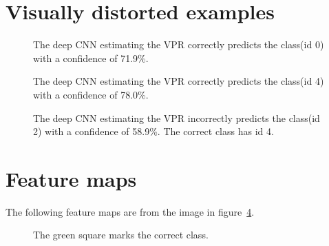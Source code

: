 \section{Visually distorted examples}
\label{sec:vdexamples}
\begin{figure}[H]
	\begin{center}
	\begin{scriptsize}
		\sffamily
		
	\end{scriptsize}
	\end{center}
	\caption[Visually distorted example]{The deep CNN estimating the VPR correctly predicts the class(id 0) with a confidence of 71.9\%.}
	\label{fig:vd1}
\end{figure}

\begin{figure}[H]
	\begin{center}
	\begin{scriptsize}
		\sffamily
		
	\end{scriptsize}
	\end{center}
	\caption[Visually distorted example]{The deep CNN estimating the VPR correctly predicts the class(id 4) with a confidence of 78.0\%.}
	\label{fig:vd2}
\end{figure}

\begin{figure}[H]
	\begin{center}
	\begin{scriptsize}
		\sffamily
		
	\end{scriptsize}
	\end{center}
	\caption[Visually distorted example]{The deep CNN estimating the VPR incorrectly predicts the class(id 2) with a confidence of 58.9\%. The correct class has id 4.}
	\label{fig:vd3}
\end{figure}

\section{Feature maps}
\label{sec:featuremaps-appendix}
The following feature maps are from the image in figure~\ref{fig:hp1}.

\begin{figure}[H]
	\begin{center}
	\begin{scriptsize}
		\sffamily
		
	\end{scriptsize}
	\end{center}
	\caption[Feature maps image]{The green square marks the correct class.}
	\label{fig:hp1}
\end{figure}

